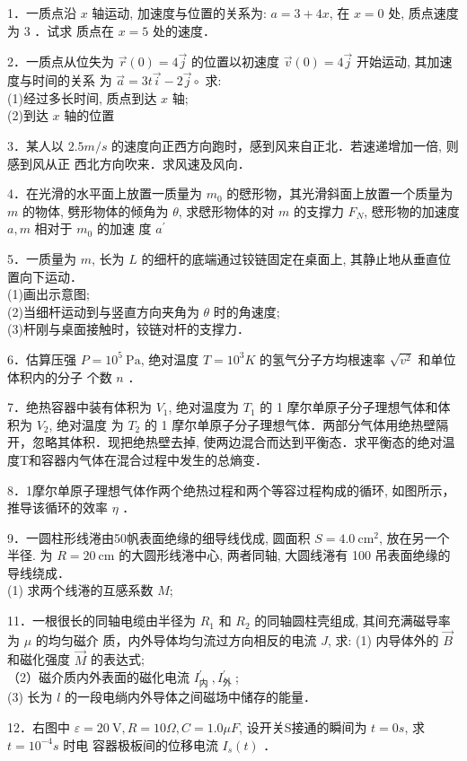 
1．一质点沿 $x$ 轴运动, 加速度与位置的关系为: $a=3+4 x$, 在 $x=0$ 处, 质点速度为 3 ．试求 质点在 $x=5$ 处的速度．

2．一质点从位失为 $\vec{r}(0)=4 \vec{j}$ 的位置以初速度 $\vec{v}(0)=4 \vec{j}$ 开始运动, 其加速度与时间的关系 为 $\vec{a}=3 t \vec{i}-2 \vec{j} \circ$ 求:\\
(1)经过多长时间, 质点到达 $x$ 轴;\\
(2)到达 $x$ 轴的位置

3．某人以 $2.5 m / s$ 的速度向正西方向跑时，感到风来自正北．若速递增加一倍, 则感到风从正 西北方向吹来．求风速及风向．

4．在光滑的水平面上放置一质量为 $m_{0}$ 的憵形物，其光滑斜面上放置一个质量为 $m$ 的物体, 劈形物体的倾角为 $\theta$, 求憵形物体的对 $m$ 的支撑力 $F_{N}$, 憵形物的加速度 $a, m$ 相对于 $m_{0}$ 的加速 度 $a^{\prime}$

5．一质量为 $m$, 长为 $L$ 的细杆的底端通过铰链固定在桌面上, 其静止地从垂直位置向下运动．\\
(1)画出示意图;\\
(2)当细杆运动到与竖直方向夹角为 $\theta$ 时的角速度;\\
(3)杆刚与桌面接触时，铰链对杆的支撑力．

6．估算压强 $P=10^{5} \mathrm{~Pa}$, 绝对温度 $T=10^{3} K$ 的氢气分子方均根速率 $\sqrt{v^{2}}$ 和单位体积内的分子 个数 $n$ ．

7．绝热容器中装有体积为 $V_{1}$, 绝对温度为 $T_{1}$ 的 1 摩尔单原子分子理想气体和体积为 $V_{2}$, 绝对温度 为 $T_{2}$ 的 1 摩尔单原子分子理想气体．两部分气体用绝热壁隔开，忽略其体积．现把绝热壁去掉, 使两边混合而达到平衡态．求平衡态的绝对温度T和容器内气体在混合过程中发生的总熵变．

8．1摩尔单原子理想气体作两个绝热过程和两个等容过程构成的循环, 如图所示，推导该循环的效率 $\eta$ ．

9．一圆柱形线淃由50帆表面绝缘的细导线伐成, 圆面积 $S=4.0 \mathrm{~cm}^{2}$, 放在另一个半径. 为 $R=20 \mathrm{~cm}$ 的大圆形线淃中心, 两者同轴, 大圆线淃有 100 吊表面绝缘的导线绕成．\\
(1) 求两个线淃的互感系数 $M$;

11．一根很长的同轴电缆由半径为 $R_{1}$ 和 $R_{2}$ 的同轴圆柱壳组成, 其间充满磁导率为 $\mu$ 的均匀磁介 质，内外导体均匀流过方向相反的电流 $J$, 求:
(1) 内导体外的 $\vec{B}$ 和磁化强度 $\vec{M}$ 的表达式;\\
（2）磁介质内外表面的磁化电流 $I_{\text {内 }}^{\prime}, I_{\text {外 }}^{\prime}$;\\
(3) 长为 $l$ 的一段电绱内外导体之间磁场中储存的能量．

12．右图中 $\varepsilon=20 \mathrm{~V}, R=10 \Omega, C=1.0 \mu F$, 设开关S接通的瞬间为 $t=0 s$, 求 $t=10^{-4} s$ 时电 容器极板间的位移电流 $I_{s}(t)$ ．